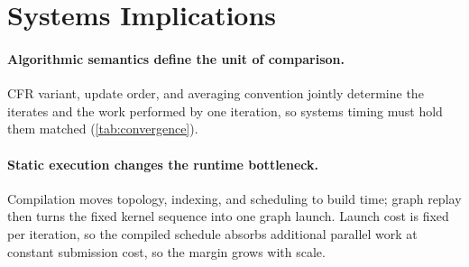 \section{Systems Implications}
\label{sec:discussion}

\paragraph{Algorithmic semantics define the unit of comparison.}
CFR variant, update order, and averaging convention jointly determine the iterates
\cite{burch2019revisiting}
and the work performed by one iteration, so systems timing must hold them matched
(\cref{tab:convergence}).

\paragraph{Static execution changes the runtime bottleneck.}
Compilation moves topology, indexing, and scheduling to build time; graph
replay then turns the fixed kernel sequence into one graph launch. Launch cost is
fixed per iteration, so the compiled schedule absorbs additional parallel work at
constant submission cost, so the margin grows with scale.
